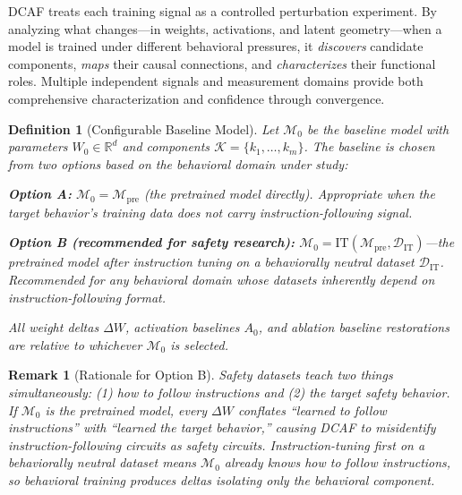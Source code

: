 \documentclass[11pt]{article}
\newtheorem{definition}{Definition}[section]
\newtheorem{remark}{Remark}[section]
\begin{document}
DCAF treats each training signal as a controlled perturbation experiment. By analyzing what changes---in weights, activations, and latent geometry---when a model is trained under different behavioral pressures, it \textit{discovers} candidate components, \textit{maps} their causal connections, and \textit{characterizes} their functional roles. Multiple independent signals and measurement domains provide both comprehensive characterization and confidence through convergence.

\begin{definition}[Configurable Baseline Model]
\label{def:baseline-model}
Let $\mathcal{M}_0$ be the baseline model with parameters $W_0 \in \mathbb{R}^d$ and components $\mathcal{K} = \{k_1, \ldots, k_m\}$. The baseline is chosen from two options based on the behavioral domain under study:

\textbf{Option A:} $\mathcal{M}_0 = \mathcal{M}_{\text{pre}}$ (the pretrained model directly). Appropriate when the target behavior's training data does not carry instruction-following signal.

\textbf{Option B (recommended for safety research):} $\mathcal{M}_0 = \text{IT}(\mathcal{M}_{\text{pre}}, \mathcal{D}_{\text{IT}})$---the pretrained model after instruction tuning on a behaviorally neutral dataset $\mathcal{D}_{\text{IT}}$. Recommended for any behavioral domain whose datasets inherently depend on instruction-following format.

All weight deltas $\Delta W$, activation baselines $A_0$, and ablation baseline restorations are relative to whichever $\mathcal{M}_0$ is selected.
\end{definition}

\begin{remark}[Rationale for Option B]
Safety datasets teach two things simultaneously: (1) how to follow instructions and (2) the target safety behavior. If $\mathcal{M}_0$ is the pretrained model, every $\Delta W$ conflates ``learned to follow instructions'' with ``learned the target behavior,'' causing DCAF to misidentify instruction-following circuits as safety circuits. Instruction-tuning first on a behaviorally neutral dataset means $\mathcal{M}_0$ already knows how to follow instructions, so behavioral training produces deltas isolating only the behavioral component.
\end{remark}
\end{document}
